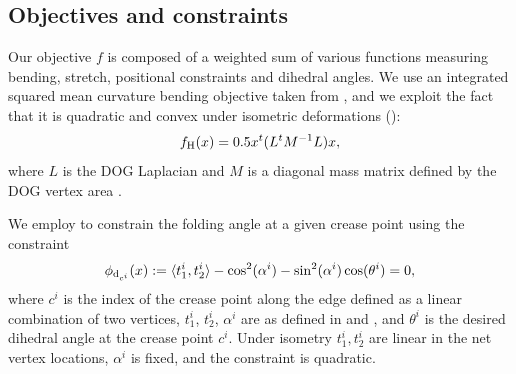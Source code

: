 \subsection{Objectives and constraints} \label{sec:dog_obj}
Our objective $f$ is composed of a weighted sum of various functions measuring bending, stretch, positional constraints and dihedral angles.
We use an integrated squared mean curvature bending objective taken from \cite{rabi2018shape}, and we exploit the fact that it is quadratic and convex under isometric deformations (\cite{quadratic_bending}):
\begin{equation}
f_\text{H}(x) = 0.5x^t(L^tM^{-1}L)x,
\end{equation}
where $L$ is the DOG Laplacian and $M$ is a diagonal mass matrix defined by the DOG vertex area \cite{rabi2018shape}.

 We employ  to constrain the folding angle at a given crease point using the constraint
\begin{equation}
\phi_{\text{d}_{c^i}}(x) := \langle t_1^i, t_2^i \rangle - \cos^2(\alpha^i) - \sin^2(\alpha^i) \cos(\theta^i) = 0,
\end{equation}
where $c^i$ is the index of the crease point along the edge defined as a linear combination of two vertices, $t_1^i$, $t_2^i$, $\alpha^i$ are as defined in  and , and $\theta^i$ is the desired dihedral angle at the crease point $c^i$. Under isometry $t_1^i,t_2^i$ are linear in the net vertex locations, $\alpha^i$ is fixed, and the constraint is quadratic.

